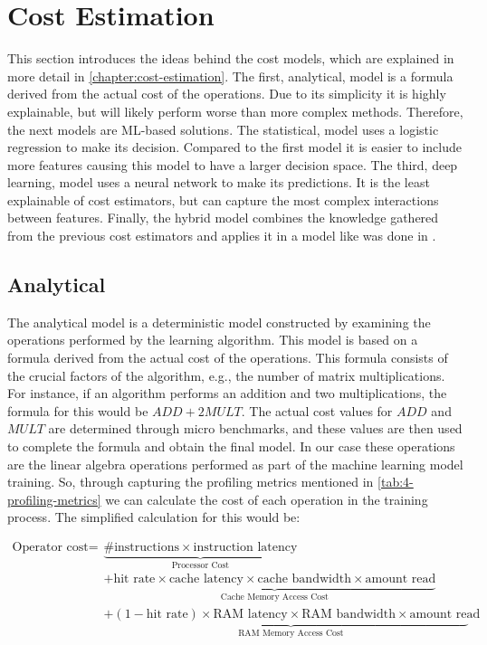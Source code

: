 \section{Cost Estimation}
\label{sec:4-cost-estimation}

This section introduces the ideas behind the cost models, which are explained in more detail in \autoref{chapter:cost-estimation}. The first, analytical, model is a formula derived from the actual cost of the operations. Due to its simplicity it is highly explainable, but will likely perform worse than more complex methods. Therefore, the next models are ML-based solutions. The statistical, model uses a logistic regression to make its decision. Compared to the first model it is easier to include more features causing this model to have a larger decision space. The third, deep learning, model uses a neural network to make its predictions. It is the least explainable of cost estimators, but can capture the most complex interactions between features. Finally, the hybrid model combines the knowledge gathered from the previous cost estimators and applies it in a model like was done in \cite{halide_cost_model}.

\subsection{Analytical}
The analytical model is a deterministic model constructed by examining the operations performed by the learning algorithm. This model is based on a formula derived from the actual cost of the operations. This formula consists of the crucial factors of the algorithm, e.g., the number of matrix multiplications. For instance, if an algorithm performs an addition and two multiplications, the formula for this would be $ADD + 2MULT$. The actual cost values for $ADD$ and $MULT$ are determined through micro benchmarks, and these values are then used to complete the formula and obtain the final model. In our case these operations are the linear algebra operations performed as part of the machine learning model training. So, through capturing the profiling metrics mentioned in \autoref{tab:4-profiling-metrics} we can calculate the cost of each operation in the training process. The simplified calculation for this would be:

\vspace{-0.5cm}
\begin{align*}
    \text{{Operator cost}} = & \underbrace{\# \text{{instructions}} \times \text{{instruction latency}}}_{\text{{Processor Cost}}}                                                            \\
                             & + \underbrace{\text{{hit rate}} \times \text{{cache latency}} \times \text{{cache bandwidth}} \times \text{{amount read}}}_{\text{{Cache Memory Access Cost}}} \\
                             & + \underbrace{(1 - \text{{hit rate}}) \times \text{{RAM latency}} \times \text{{RAM bandwidth}} \times \text{{amount read}}}_{\text{{RAM Memory Access Cost}}}
\end{align*}


